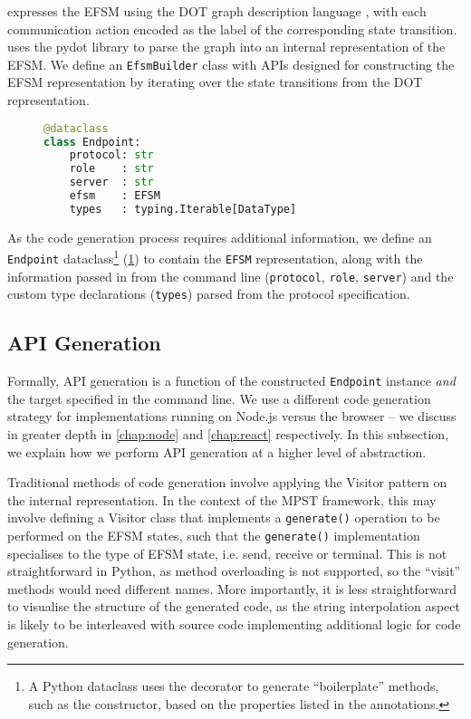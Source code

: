  expresses the EFSM using the 
DOT graph description language \cite{dot}, with each
communication action encoded as the label of the corresponding
state transition. 
 uses the pydot library \cite{pydot}
to parse the graph into an internal representation of the EFSM.
We define an \texttt{EfsmBuilder} class with APIs designed for
constructing the EFSM representation by iterating over the 
state transitions from the DOT representation.

\begin{figure}[!ht]
\begin{lstlisting}[language=Python]
@dataclass
class Endpoint:
    protocol: str
    role    : str
    server  : str
    efsm    : EFSM
    types   : typing.Iterable[DataType]
\end{lstlisting}
\label{lst:endpointapi}
\end{figure}

As the code generation process requires additional information,
we define an \texttt{Endpoint} dataclass\footnote{
A Python dataclass uses the decorator to generate
``boilerplate'' methods, such as the constructor, based on the
properties listed in the annotations.} (\cref{lst:endpointapi})
to contain the \texttt{EFSM}
representation, along with the information passed in from the
command line (\texttt{protocol}, \texttt{role}, \texttt{server}) 
and the custom type declarations (\texttt{types}) parsed from the
protocol specification.

\subsection{API Generation}
\label{subsection:apigen}

Formally, API generation is a function of the constructed
\texttt{Endpoint} instance
\textit{and} the target specified in the command line. We use a 
different code generation strategy for implementations running on
Node.js versus the browser -- we discuss in greater depth in 
\cref{chap:node} and \cref{chap:react} respectively. 
In this subsection, we explain how we perform API generation
at a higher level of abstraction.

Traditional methods of code generation involve applying the
Visitor pattern on the internal representation. 
In the context of the MPST framework,
this may involve defining a Visitor class that implements a
\texttt{generate()} operation to be performed on the EFSM states,
such that the \texttt{generate()} implementation specialises to the
type of EFSM state, i.e. send, receive or terminal.
This is not straightforward in Python, as method overloading is not 
supported, so the ``visit'' methods would need different names.
More importantly, it is less straightforward to visualise
the structure of the generated code, as the string interpolation
aspect is likely to be interleaved with source code implementing
additional logic for code generation.

